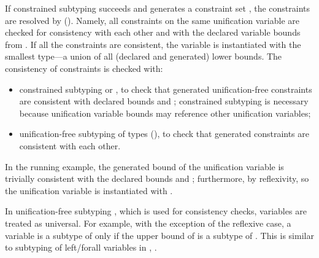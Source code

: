 If constrained subtyping succeeds and generates a constraint set
\CSet, the constraints are resolved %
by \solvectrdflt ().
Namely, all constraints on the same unification variable are checked for
consistency with each other and with the declared variable bounds from
\UEnv. If all the constraints are consistent, the variable is instantiated
with the smallest type---a union of all (declared and generated) lower bounds.
The consistency of constraints is checked with:
\begin{itemize}
    \item constrained subtyping \subtyctrLdflt{\tylb}{\ty} or
        \subtyctrRdflt{\ty}{\tyub}, to check that generated unification-free
        constraints \ty are consistent with declared bounds \tylb and \tyub;
        constrained subtyping is necessary because unification variable
        bounds may reference other unification variables;
    \item unification-free subtyping of types \subtydflt{\tylb}{\tyub}
        (),
        to check that generated constraints are consistent with each other.
\end{itemize}
In the running example, the generated bound \vx of the unification variable \va
is trivially consistent with the declared bounds \tybot and \tyany;
furthermore, \subty{\vx{\symsub}\tyint}{\vx}{\vx} by reflexivity,
so the unification variable \va is instantiated with \vx.

In unification-free subtyping , 
which is used for consistency checks,
variables are treated as universal. For example, with the exception of
the reflexive case, a variable \vany is a subtype of \ty only if the upper bound
\tyub of \vany is a subtype of \ty. This is similar to subtyping of
left/forall variables in , .


